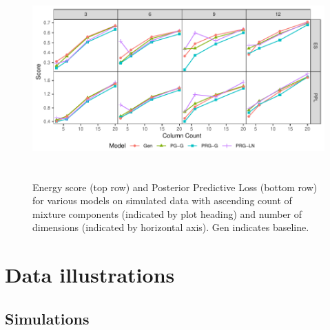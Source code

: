 

\begin{figure}[htb]
    \centering
    \caption{Energy score (top row) and Posterior Predictive Loss (bottom row) for various models on simulated data with ascending count of mixture components (indicated by plot heading) and number of dimensions (indicated by horizontal axis).  Gen indicates baseline.\label{fig:simpples}}
    \includegraphics[height=3in, width = \textwidth]{./images/simulation_score}
\end{figure}


\section{Data illustrations\label{sec:results}}

\subsection{Simulations\label{subsec:simulated}}

